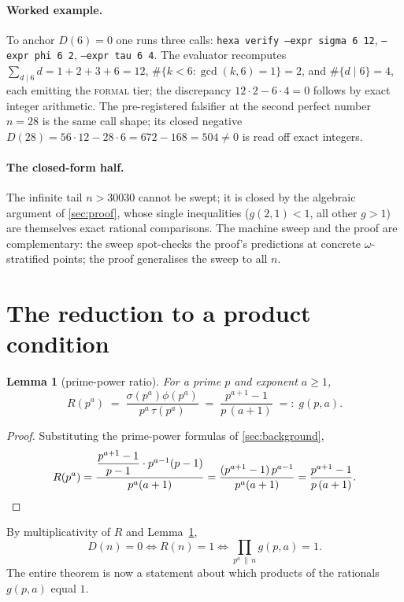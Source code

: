 \documentclass[11pt,a4paper]{article}
\newcommand{\sig}{\sigma}
\theoremstyle{plain}
\newtheorem{lemma}{Lemma}
\theoremstyle{definition}
\begin{document}
\paragraph{Worked example.} To anchor $D(6)=0$ one runs three calls:
\texttt{hexa verify --expr sigma 6 12}, \texttt{--expr phi 6 2},
\texttt{--expr tau 6 4}. The evaluator recomputes
$\sum_{d\mid6}d=1+2+3+6=12$, $\#\{k<6:\gcd(k,6)=1\}=2$, and $\#\{d\mid6\}=4$,
each emitting the \textsc{formal} tier; the discrepancy
$12\cdot2-6\cdot4=0$ follows by exact integer arithmetic. The pre-registered
falsifier at the second perfect number $n=28$ is the same call shape; its
closed negative $D(28)=56\cdot12-28\cdot6=672-168=504\neq0$ is read off exact
integers.

\paragraph{The closed-form half.} The infinite tail $n>30030$ cannot be swept;
it is closed by the algebraic argument of \textsection\ref{sec:proof}, whose
single inequalities ($g(2,1)<1$, all other $g>1$) are themselves exact rational
comparisons. The machine sweep and the proof are complementary: the sweep
spot-checks the proof's predictions at concrete $\omega$-stratified points; the
proof generalises the sweep to all $n$.

\section{The reduction to a product condition}
\label{sec:reduction}

\begin{lemma}[prime-power ratio]
\label{lem:g}
For a prime $p$ and exponent $a\ge1$,
\[
  R(p^a)\;=\;\frac{\sig(p^a)\phi(p^a)}{p^a\,\tau(p^a)}
  \;=\;\frac{p^{a+1}-1}{p\,(a+1)} \;=:\; g(p,a).
\]
\end{lemma}
\begin{proof}
Substituting the prime-power formulas of \textsection\ref{sec:background},
\[
  R(p^a)=\frac{\dfrac{p^{a+1}-1}{p-1}\cdot p^{a-1}(p-1)}{p^a(a+1)}
        =\frac{(p^{a+1}-1)\,p^{a-1}}{p^a(a+1)}
        =\frac{p^{a+1}-1}{p\,(a+1)} . \qedhere
\]
\end{proof}

\noindent By multiplicativity of $R$ and Lemma~\ref{lem:g},
\begin{equation}
  D(n)=0 \iff R(n)=1 \iff \prod_{p^a\,\|\,n} g(p,a)=1 .
  \label{eq:prodcond}
\end{equation}
The entire theorem is now a statement about which products of the rationals
$g(p,a)$ equal $1$.
\end{document}
